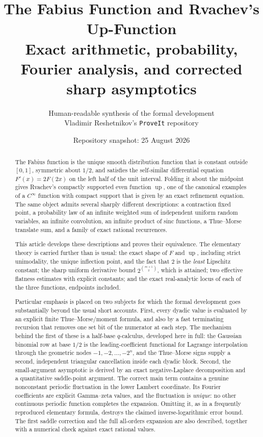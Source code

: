 \documentclass[11pt,oneside]{article}
\title{\bfseries The Fabius Function and Rvachev's Up-Function\\[0.35em]
\large Exact arithmetic, probability, Fourier analysis, and corrected sharp asymptotics}
\author{Human-readable synthesis of the formal development\\
\small Vladimir Reshetnikov's \texttt{ProveIt} repository}
\date{Repository snapshot: 25 August 2026}
\theoremstyle{definition}
\theoremstyle{remark}
\newcommand{\Up}{\operatorname{up}}
\begin{document}
\maketitle

\begin{abstract}
The Fabius function is the unique smooth distribution function that is constant outside
$[0,1]$, symmetric about $1/2$, and satisfies the self-similar differential equation
$F'(x)=2F(2x)$ on the left half of the unit interval.  Folding it about the midpoint gives
Rvachev's compactly supported even function $\Up$, one of the canonical examples of a
$C^\infty$ function with compact support that is given by an exact refinement equation.
The same object admits several sharply different descriptions: a contraction fixed point,
a probability law of an infinite weighted sum of independent uniform random variables, an
infinite convolution, an infinite product of sinc functions, a Thue--Morse translate sum,
and a family of exact rational recurrences.

This article develops these descriptions and proves their equivalence.  The elementary
theory is carried further than is usual: the exact shape of $F$ and $\Up$, including strict
unimodality, the unique inflection point, and the fact that $2$ is the \emph{least} Lipschitz
constant; the sharp uniform derivative bound $2^{\binom{m+1}{2}}$, which is attained; two
effective flatness estimates with explicit constants; and the exact real-analytic locus of
each of the three functions, endpoints included.

Particular emphasis
is placed on two subjects for which the formal development goes substantially beyond the
usual short accounts.  First, every dyadic value is evaluated by an explicit finite
Thue--Morse/moment formula, and also by a fast terminating recursion that removes one set bit
of the numerator at each step.  The mechanism behind the first of these is a half-base
$q$-calculus, developed here in full: the Gaussian binomial row at base $1/2$ is the
leading-coefficient functional for Lagrange interpolation through the geometric nodes
$-1,-2,\ldots,-2^n$, and the Thue--Morse signs supply a second, independent triangular
cancellation inside each dyadic block.  Second, the small-argument asymptotic is derived by
an exact negative-Laplace decomposition and a quantitative saddle-point argument.  The
correct main term contains a genuine nonconstant periodic fluctuation in the lower Lambert
coordinate.  Its Fourier coefficients are explicit Gamma--zeta values, and the fluctuation is
\emph{unique}: no other continuous periodic function completes the expansion.  Omitting it,
as in a frequently reproduced elementary formula, destroys the claimed inverse-logarithmic
error bound.  The first saddle correction and the full all-orders expansion are also
described, together with a numerical check against exact rational values.


\end{abstract}
\end{document}
